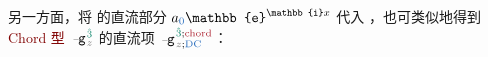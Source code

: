 另一方面，将  的\textcolor{NavyBlue}{直流部分} $a_{\textcolor{NavyBlue}{0}} \mathbb{e}^{\mathbb{i}{x}}$ 代入 ，也可类似地得到 \textcolor{Maroon}{Chord 型} $\xint{\begin{smallmatrix} ~ \\ {}^{}_{\mathcolor{gray}{-}} \\ ~ \end{smallmatrix}}{09}{\mathtt{g}}^{\;\! \textcolor{PineGreen}{\hat{3}}}_{\;\! \mathcolor{gray}{z}}$ 的\textcolor{NavyBlue}{直流项} $\xint{\begin{smallmatrix} ~ \\ {}^{}_{\mathcolor{gray}{-}} \\ ~ \end{smallmatrix}}{09}{\mathtt{g}}^{\;\! \textcolor{PineGreen}{\hat{3}};\text{\textcolor{Maroon}{chord}}}_{\;\! \mathcolor{gray}{z};\text{\textcolor{NavyBlue}{DC}}}$：
